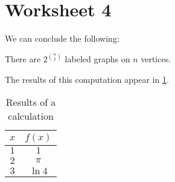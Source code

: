 \documentclass[twoside]{article}
\begin{document}
\section*{Worksheet 4}
\begin{pset}
  We can conclude the following:
  \begin{theorem*}
    There are $2^{\binom{n}{2}}$ labeled graphs on $n$ vertices.
  \end{theorem*}

  The results of this computation appear in \cref{tab:example}.

  \begin{table}[htb]
    \centering
    \begin{tabular}{c c}
      \toprule
      $x$ & $f(x)$ \\ \midrule
      $1$ & $1$ \\
      $2$ & $\pi$ \\
      $3$ & $\ln 4$ \\
      \bottomrule
    \end{tabular}
    \caption{Results of a calculation}
    \label{tab:example}
  \end{table}
\end{pset}
\end{document}

